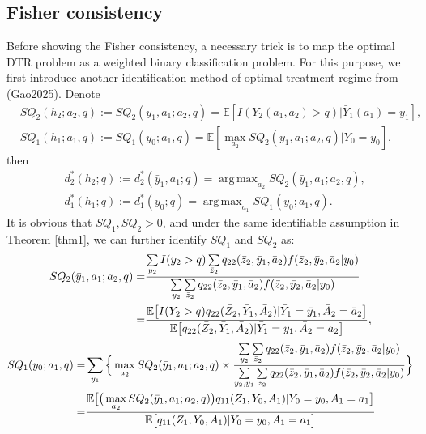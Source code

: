 \documentclass[10pt]{article}
\DeclareMathOperator*{\argmax}{arg\,max}
\theoremstyle{remark} \newtheorem{rem}{Remark}
\begin{document}
\subsection{Fisher consistency}
Before showing the Fisher consistency, a necessary trick is to map the optimal DTR problem as a weighted binary classification problem.
For this purpose, we first introduce another identification method of optimal treatment regime from (Gao2025). Denote
\begin{align}
    & SQ_2(h_2;a_2,q):= SQ_2(\bar y_1,a_1;a_2,q) = \mathbb{E}[I(Y_2(a_1,a_2)>q)|\bar Y_1(a_1)=\bar y_1], \\
    & SQ_1(h_1;a_1,q) := SQ_1(y_0;a_1,q) = \mathbb{E}[\max_{a_2}SQ_2(\bar y_1,a_1;a_2,q)|Y_0=y_0],
\end{align}
then
\begin{align}
    & d_2^*(h_2;q):= d_2^*(\bar y_1,a_1;q) = \argmax_{a_2} SQ_2(\bar y_1,a_1;a_2,q),\\
    & d_1^*(h_1;q):= d_1^*(y_0;q) = \argmax_{a_1} SQ_1(y_0;a_1,q).
\end{align}
It is obvious that $SQ_1, SQ_2 >0$, and under the same identifiable assumption in Theorem \ref{thm1}, we can further identify $SQ_1$ and $SQ_2$ as:
\begin{align}
    SQ_2(\bar y_1,a_1;a_2,q) =& \frac{\sum\limits_{y_2}I(y_2>q)\sum\limits_{\bar z_2}q_{22}(\bar z_2,\bar y_1,\bar a_2)f(\bar z_2,\bar y_2,\bar a_2|y_0)}{\sum\limits_{y_2}\sum\limits_{\bar z_2}q_{22}(\bar z_2,\bar y_1,\bar a_2)f(\bar z_2,\bar y_2,\bar a_2|y_0)} \notag\\ 
    =& \frac{\mathbb{E}\big[I(Y_2>q)q_{22}(\bar Z_2, \bar Y_1, \bar A_2)|\bar Y_1= \bar y_1, \bar A_2= \bar a_2\big]}{\mathbb{E}\big[q_{22}(\bar Z_2, \bar Y_1, \bar A_2)|\bar Y_1= \bar y_1, \bar A_2= \bar a_2\big]}, \label{sq2}
\end{align}
\begin{align}
    SQ_1(y_0;a_1,q) =& \sum_{y_1}\Big\{\max_{a_2}SQ_2(\bar y_1,a_1;a_2,q) \times
     \frac{\sum\limits_{y_2}\sum\limits_{\bar z_2}q_{22}(\bar z_2,\bar y_1,\bar a_2)f(\bar z_2,\bar y_2,\bar a_2|y_0)}{\sum\limits_{y_2,y_1}\sum\limits_{\bar z_2}q_{22}(\bar z_2,\bar y_1,\bar a_2)f(\bar z_2,\bar y_2,\bar a_2|y_0)}\Big\} \notag\\
    =& \frac{\mathbb{E}\big[\big(\max\limits_{a_2}SQ_2(\bar y_1,a_1;a_2,q)\big)q_{11}(Z_1, Y_0, A_1)|Y_0= y_0, A_1= a_1\big]}{\mathbb{E}\big[q_{11}(Z_1, Y_0, A_1)|Y_0= y_0, A_1= a_1\big]} \label{sq1}
\end{align}
\end{document}
